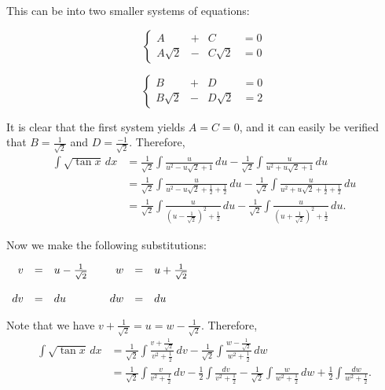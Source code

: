 \documentclass[12pt]{article}
\begin{document}
This can be  into two smaller systems of equations:

\[
\left\{
\begin{array}{rcrc}
A         & + & C         & =0 \\
A\sqrt{2} & - & C\sqrt{2} & =0
\end{array}
\right.
\]

\[
\left\{
\begin{array}{rcrc}
B         & + & D         & =0 \\
B\sqrt{2} & - & D\sqrt{2} & =2
\end{array}
\right.
\]

It is clear that the first system yields $A=C=0$, and it can easily be verified that $B=\frac{1}{\sqrt{2}}$ and $D=\frac{-1}{\sqrt{2}}$.  Therefore,
\begin{align*}
\int\sqrt{\tan x} \, dx & =\frac{1}{\sqrt{2}}\int\frac{u}{u^2-u\sqrt{2}+1} \, du-\frac{1}{\sqrt{2}}\int\frac{u}{u^2+u\sqrt{2}+1} \, du \\
& =\frac{1}{\sqrt{2}}\int\frac{u}{u^2-u\sqrt{2}+\frac{1}{2}+\frac{1}{2}} \, du-\frac{1}{\sqrt{2}}\int\frac{u}{u^2+u\sqrt{2}+\frac{1}{2}+\frac{1}{2}} \, du \\
& =\frac{1}{\sqrt{2}}\int\frac{u}{(u-\frac{1}{\sqrt{2}})^2+\frac{1}{2}} \, du-\frac{1}{\sqrt{2}}\int\frac{u}{(u+\frac{1}{\sqrt{2}})^2+\frac{1}{2}} \, du.
\end{align*}

Now we make the following substitutions:

\begin{center}
$\begin{array}{rclcrcl}
v  & = & u-\frac{1}{\sqrt{2}} & \bigskip & w  & = & u+\frac{1}{\sqrt{2}} \\
dv & = & du                   &          & dw & = & du
\end{array}$
\end{center}

Note that we have $v+\frac{1}{\sqrt{2}}=u=w-\frac{1}{\sqrt{2}}$.  Therefore,
\begin{align*}
\int\sqrt{\tan x} \, dx & =\frac{1}{\sqrt{2}}\int\frac{v+\frac{1}{\sqrt{2}}}{v^2+\frac{1}{2}} \, dv-\frac{1}{\sqrt{2}}\int\frac{w-\frac{1}{\sqrt{2}}}{w^2+\frac{1}{2}} \, dw \\
& =\frac{1}{\sqrt{2}}\int\frac{v}{v^2+\frac{1}{2}} \, dv-\frac{1}{2}\int\frac{dv}{v^2+\frac{1}{2}}-\frac{1}{\sqrt{2}}\int\frac{w}{w^2+\frac{1}{2}} \, dw+\frac{1}{2}\int\frac{dw}{w^2+\frac{1}{2}}.
\end{align*}
\end{document}
